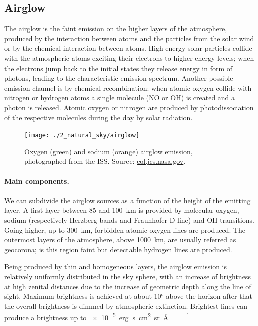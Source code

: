 \subsection{Airglow}
The airglow is the faint emission on the higher layers of the atmosphere, produced by the interaction between atoms and the particles from the solar wind or by the chemical interaction between atoms. High energy solar particles collide with the atmospheric atoms exciting their electrons to higher energy levels; when the electrons jump back to the initial states they release energy in form of photons, leading to the characteristic emission spectrum. Another possible emission channel is by chemical recombination: when atomic oxygen collide with nitrogen or hydrogen atoms a single molecule (NO or OH) is created and a photon is released. Atomic oxygen or nitrogen are produced by photodissociation of the respective molecules during the day by solar radiation.
\begin{figure}
	\centering
	\texttt{[image: ./2\_natural\_sky/airglow]}
	\caption{Oxygen (green) and sodium (orange) airglow emission, photographed from the ISS. Source: \href{https://eol.jsc.nasa.gov/SearchPhotos/photo.pl?mission=ISS043&roll=E&frame=143486}{eol.jcs.nasa.gov}.\label{fig:airglow}}
\end{figure}

\paragraph{Main components.} We can subdivide the airglow sources as a function of the height of the emitting layer. A first layer between 85 and \SI{100}{km} is provided by molecular oxygen, sodium (respectively Herzberg  bands and Fraunhofer D line) and OH transitions. Going higher, up to \SI{300}{km}, forbidden atomic oxygen lines are produced. The outermost layers of the atmosphere, above \SI{1000}{km}, are usually referred as geocorona; is this region faint but detectable hydrogen lines are produced.

Being produced by thin and homogeneous layers, the airglow emission is relatively uniformly distributed in the sky sphere, with an increase of brightness at high zenital distances due to the increase of geometric depth along the line of sight. Maximum brightness is achieved at about \ang{10} above the horizon after that the overall brightness is dimmed by atmospheric extinction. Brightest lines can produce a brightness up to \SI{e-5}{erg\per\second \per\centi\metre\squared \per\steradian\per\angstrom}

